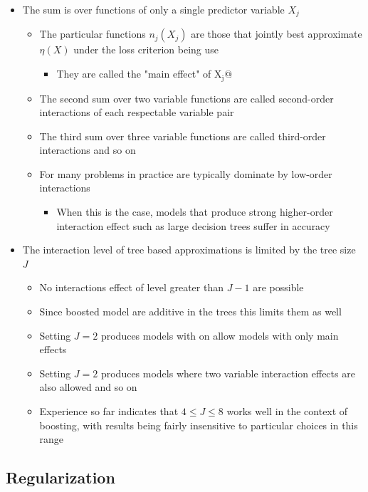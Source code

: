 \documentclass[11pt]{article}
\begin{document}
\begin{itemize}
\item The sum is over functions of only a single predictor variable \(X_j\)
\begin{itemize}
\item The particular functions \(n_j(X_j)\) are those that jointly best approximate \(\eta(X)\) under the loss criterion being use
\begin{itemize}
\item They are called the "main effect" of X\(_{\text{j}}\)@
\end{itemize}
\item The second sum over two variable functions are called second-order interactions of each respectable variable pair
\item The third sum over three variable functions are called third-order interactions and so on
\item For many problems in practice are typically dominate by low-order interactions
\begin{itemize}
\item When this is the case, models that produce strong higher-order interaction effect such as large decision trees suffer in accuracy
\end{itemize}
\end{itemize}

\item The interaction level of tree based approximations is limited by the tree size \(J\)
\begin{itemize}
\item No interactions effect of level greater than \(J-1\) are possible
\item Since boosted model are additive in the trees this limits them as well
\item Setting \(J=2\) produces models with on allow models with only main effects
\item Setting \(J=2\) produces models where two variable interaction effects are also allowed and so on
\item Experience so far indicates that \(4 \leq J \leq 8\) works well in the context of boosting, with results being fairly insensitive to particular choices in this range
\end{itemize}
\end{itemize}

\subsection{Regularization}
\label{sec:org9ea3cc8}
\end{document}
